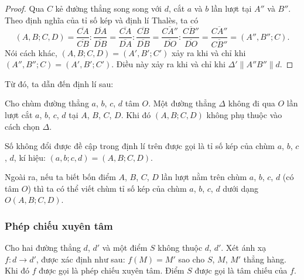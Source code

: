 \documentclass{article} %
\begin{document}
        \begin{proof}
            Qua \(C\) kẻ đường thẳng song song với \(d\), cắt \(a\) và \(b\) lần lượt tại \(A''\) và \(B''\). Theo định nghĩa của tỉ số kép và định lí Thalès, ta có
            \begin{equation}
                (A,B;C,D) = \frac{\overline{CA}}{\overline{CB}} : \frac{\overline{DA}}{\overline{DB}} = \frac{\overline{CA}}{\overline{DA}} : \frac{\overline{CB}}{\overline{DB}} = \frac{\overline{CA''}}{\overline{DO}} : \frac{\overline{CB''}}{\overline{DO}} = \frac{\overline{CA''}}{\overline{CB''}} = (A'',B'';C).
                \label{crossratio1}
            \end{equation}
            Nói cách khác, \((A,B;C,D) = (A',B';C')\) xảy ra khi và chỉ khi \((A'',B'';C) = (A',B';C')\). Điều này xảy ra khi và chỉ khi \(\Delta' \parallel A''B'' \parallel d\).
        \end{proof}

        Từ đó, ta dẫn đến định lí sau:

        \begin{theorem}
            Cho chùm đường thẳng \(a\), \(b\), \(c\), \(d\) tâm \(O\). Một đường thẳng \(\Delta\) không đi qua \(O\) lần lượt cắt \(a\), \(b\), \(c\), \(d\) tại \(A\), \(B\), \(C\), \(D\). Khi đó \((A,B;C,D)\) không phụ thuộc vào cách chọn \(\Delta\).
        \end{theorem}

        \begin{definition}
            Số không đổi được đề cập trong định lí trên được gọi là tỉ số kép của chùm \(a\), \(b\), \(c\), \(d\), kí hiệu: \((a,b;c,d) = (A,B;C,D)\).
        \end{definition}

        Ngoài ra, nếu ta biết bốn điểm \(A\), \(B\), \(C\), \(D\) lần lượt nằm trên chùm \(a\), \(b\), \(c\), \(d\) (có tâm \(O\)) thì ta có thể viết chùm tỉ số kép của chùm \(a\), \(b\), \(c\), \(d\) dưới dạng \(O(A,B;C,D)\).

    \subsubsection*{Phép chiếu xuyên tâm}

        \begin{definition}
            Cho hai đường thẳng \(d\), \(d'\) và một điểm \(S\) không thuộc \(d\), \(d'\). Xét ánh xạ \(f: d \to d'\), được xác định như sau: \(f(M) = M'\) sao cho \(S\), \(M\), \(M'\) thẳng hàng. Khi đó \(f\) được gọi là phép chiếu xuyên tâm. Điểm \(S\) được gọi là tâm chiếu của \(f\).
        \end{definition}
\end{document}
